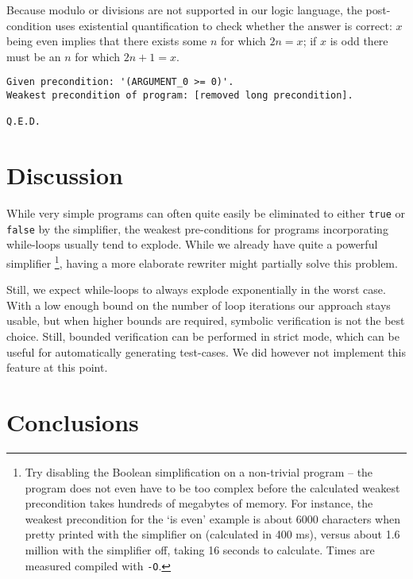 \documentclass[a4paper]{article}
\begin{document}
Because modulo or divisions are not supported in our logic language, the post-condition uses existential quantification to check whether the answer is correct: $x$ being even implies that there exists some $n$ for which $2n = x$; if $x$ is odd there must be an $n$ for which $2n + 1 = x$.

\begin{verbatim}
Given precondition: '(ARGUMENT_0 >= 0)'.
Weakest precondition of program: [removed long precondition].

Q.E.D.
\end{verbatim}

\section{Discussion}
While very simple programs can often quite easily be eliminated to either \texttt{true} or \texttt{false} by the simplifier, the weakest pre-conditions for programs incorporating while-loops usually tend to explode. While we already have quite a powerful simplifier \footnote{Try disabling the Boolean simplification on a non-trivial program -- the program does not even have to be too complex before the calculated weakest precondition takes hundreds of megabytes of memory. For instance, the weakest precondition for the `is even' example is about 6000 characters when pretty printed with the simplifier on (calculated in 400 ms), versus about 1.6 million with the simplifier off, taking 16 seconds to calculate. Times are measured compiled with \texttt{-O}.}, having a more elaborate rewriter might partially solve this problem.

Still, we expect while-loops to always explode exponentially in the worst case. With a low enough bound on the number of loop iterations our approach stays usable, but when higher bounds are required, symbolic verification is not the best choice. Still, bounded verification can be performed in strict mode, which can be useful for automatically generating test-cases. We did however not implement this feature at this point.

\section{Conclusions}
\end{document}
